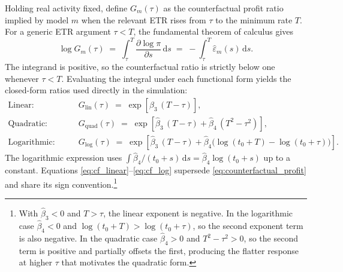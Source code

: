 \documentclass[11pt,a4paper]{article}
\begin{document}
Holding real activity fixed, define $G_m(\tau)$ as the counterfactual profit ratio implied by model $m$ when the relevant ETR rises from $\tau$ to the minimum rate $T$. For a generic ETR argument $\tau<T$, the fundamental theorem of calculus gives
\begin{equation}\label{eq:cf_integral}
\log G_m(\tau) \;=\; \int_{\tau}^{T} \frac{\partial \log \pi}{\partial s}\, \mathrm{d}s \;=\; -\int_{\tau}^{T} \hat{\varepsilon}_m(s)\,\mathrm{d}s.
\end{equation}
The integrand is positive, so the counterfactual ratio is strictly below one whenever $\tau<T$. Evaluating the integral under each functional form yields the closed-form ratios used directly in the simulation:
\begin{align}
\text{Linear:} \qquad & G_{\text{lin}}(\tau) \;=\; \exp\!\left[\hat{\beta}_3\,(T - \tau)\right], \label{eq:cf_linear}\\
\text{Quadratic:} \qquad & G_{\text{quad}}(\tau) \;=\; \exp\!\left[\hat{\beta}_3\,(T - \tau) + \hat{\beta}_4\,(T^2 - \tau^2)\right], \label{eq:cf_quad}\\
\text{Logarithmic:} \qquad & G_{\text{log}}(\tau) \;=\; \exp\!\left[\hat{\beta}_3\,(T - \tau) + \hat{\beta}_4\bigl(\log(t_0 + T) - \log(t_0 + \tau)\bigr)\right]. \label{eq:cf_log}
\end{align}
The logarithmic expression uses $\int \hat{\beta}_4 / (t_0 + s)\,\mathrm{d}s = \hat{\beta}_4 \log(t_0 + s)$ up to a constant. Equations \eqref{eq:cf_linear}--\eqref{eq:cf_log} supersede \eqref{eq:counterfactual_profit} and share its sign convention.\footnote{With $\hat{\beta}_3 < 0$ and $T > \tau$, the linear exponent is negative. In the logarithmic case $\hat{\beta}_4 < 0$ and $\log(t_0 + T) > \log(t_0 + \tau)$, so the second exponent term is also negative. In the quadratic case $\hat{\beta}_4 > 0$ and $T^2 - \tau^2 > 0$, so the second term is positive and partially offsets the first, producing the flatter response at higher $\tau$ that motivates the quadratic form.}
\end{document}
